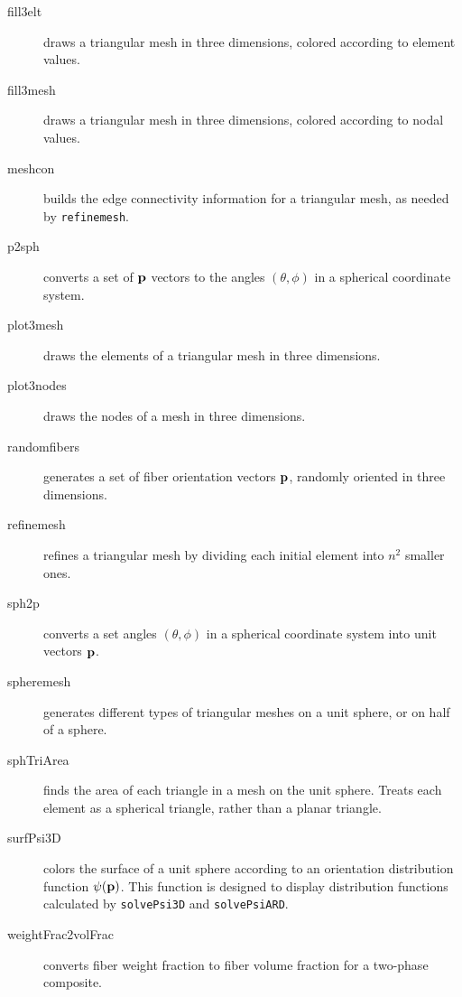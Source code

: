 \documentclass[11pt]{article}
\begin{document}
\begin{description}

    \item[fill3elt]{draws a triangular mesh in three dimensions, colored according to element values.}

    \item[fill3mesh]{draws a triangular mesh in three dimensions, colored according to nodal values.}

    \item[meshcon]{builds the edge connectivity information for a triangular mesh, as needed by \texttt{refinemesh}.}

    \item[p2sph]{converts a set of $\mathbf{p}$ vectors to the angles $(\theta, \phi)$ in a spherical coordinate system.}

    \item[plot3mesh]{draws the elements of a triangular mesh in three dimensions.}

    \item[plot3nodes]{draws the nodes of a mesh in three dimensions.}
    
    \item[randomfibers]{generates a set of fiber orientation vectors $\mathbf{p}$, randomly oriented in three dimensions.}

    \item[refinemesh]{refines a triangular mesh by dividing each initial element into $n^2$ smaller ones.}

    \item[sph2p]{converts a set angles $(\theta, \phi)$ in a spherical coordinate system into unit vectors $\mathbf{p}$.}

    \item[spheremesh]{generates different types of triangular meshes on a unit sphere, or on half of a sphere.}

    \item[sphTriArea]{finds the area of each triangle in a mesh on the unit sphere.  Treats each element as a spherical triangle, rather than a planar triangle.}

    \item[surfPsi3D]{colors the surface of a unit sphere according to an orientation distribution function $\psi (\mathbf{p})$.  This function is designed to display distribution functions calculated by \texttt{solvePsi3D} and \texttt{solvePsiARD}.}

    \item[weightFrac2volFrac]{converts fiber weight fraction to fiber volume fraction for a two-phase composite.}
    
    
\end{description}
\end{document}
